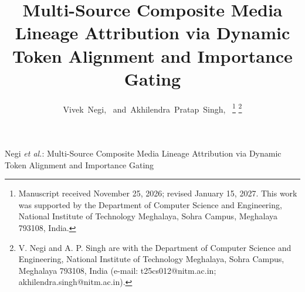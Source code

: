 \documentclass[journal]{IEEEtran}
\begin{document}
\title{Multi-Source Composite Media Lineage Attribution via Dynamic Token Alignment and Importance Gating}

\author{Vivek~Negi,~
        and~Akhilendra~Pratap~Singh,~%
\thanks{Manuscript received November 25, 2026; revised January 15, 2027. This work was supported by the Department of Computer Science and Engineering, National Institute of Technology Meghalaya, Sohra Campus, Meghalaya 793108, India.}%
\thanks{V. Negi and A. P. Singh are with the Department of Computer Science and Engineering, National Institute of Technology Meghalaya, Sohra Campus, Meghalaya 793108, India (e-mail: t25cs012@nitm.ac.in; akhilendra.singh@nitm.ac.in).}}

%
{Negi \MakeLowercase{\textit{et al.}}: Multi-Source Composite Media Lineage Attribution via Dynamic Token Alignment and Importance Gating}

\maketitle
\end{document}
